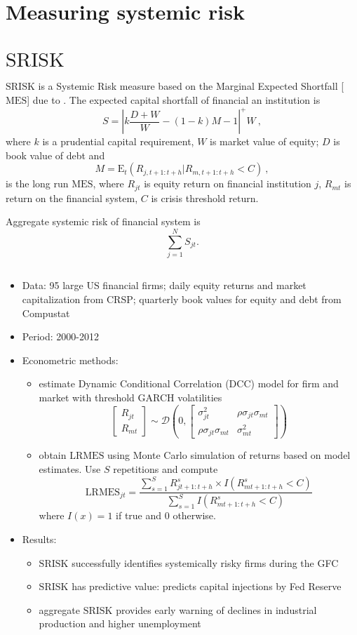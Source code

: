 \documentclass[authoryear]{elsarticle}
\newcommand{\E}{\mathrm{E}}
\newcommand{\bi}{\begin{itemize}}
\newcommand{\ei}{\end{itemize}}
\renewcommand{\i}{\item}
\newcommand{\sr}{\ensuremath{\mathrm{SRISK}}}
\newcommand{\mes}{\ensuremath{\mathrm{MES}}}
\newcommand{\lmes}{\ensuremath{\mathrm{LRMES}}}
\begin{document}
\section*{Measuring  systemic risk}

\section{$\sr$}

$\sr$ is a Systemic Risk measure based on the Marginal Expected Shortfall [$\mes$] due to  \cite{acharya2012aer}. The expected capital shortfall of financial an institution is
$$S=\left|k\frac{D+W}{W}-(1-k)M-1\right|^+W\ ,
$$
where $k$ is a prudential capital requirement, $W$ is market value of equity; $D$ is book value of debt and
$$
M=\E_t(R_{j,t+1:t+h}|R_{m,t+1:t+h}<C)\ ,
$$ 
is the long run $\mes$, 
where $R_{jt}$ is equity return on financial institution $j$, $R_{mt}$ is return on the financial system, $C$ is crisis threshold return.

Aggregate systemic risk of financial system is $$\sum_{j=1}^{N}S_{jt}.$$

\subsection{\cite{brownlees2015}}

\bi
\i Data: 95 large US financial firms; daily equity returns and market capitalization from CRSP; quarterly book values for equity and debt from Compustat
\i Period: 2000-2012 
\i Econometric methods:  
\bi
\i estimate Dynamic Conditional Correlation (DCC) model for firm and market with threshold GARCH volatilities
\begin{equation*}
\begin{bmatrix}
R_{jt}\\ 
R_{mt} 
\end{bmatrix} \sim \mathcal{D}\left ( 0, 
\begin{bmatrix}
\sigma_{jt}^2 & \rho\sigma_{jt}\sigma_{mt}\\ 
\rho\sigma_{jt}\sigma_{mt} & \sigma_{mt}^2 
\end{bmatrix}\right )
\end{equation*}
\i obtain $\lmes$ using Monte Carlo simulation of returns based on model estimates. Use $S$ repetitions and compute 
$$\lmes_{jt}=\frac{\sum_{s=1}^{S}R_{jt+1:t+h}^{s} \times I(R_{mt+1:t+h}^{s} < C)}{\sum_{s=1}^{S}I(R_{mt+1:t+h}^{s}<C)}$$
where $I(x)=1$ if true and 0 otherwise.
\ei

\i Results:
\bi
\i $\sr$ successfully identifies systemically risky firms during the GFC
\i $\sr$ has predictive value: predicts capital injections by Fed Reserve
\i aggregate $\sr$ provides early warning of declines in industrial production and higher unemployment  
\ei 
\ei
\end{document}
